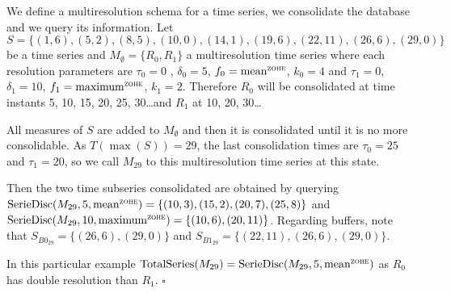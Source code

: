 \begin{example}\label{ex:model:smultiresolution} 
  We define a multiresolution schema for a time series, we consolidate
  the database and we query its information.  Let $S = \{
  (1,6),(5,2),\allowbreak (8,5),\allowbreak (10,0),\allowbreak
  (14,1),\allowbreak (19,6),\allowbreak (22,11),\allowbreak
  (26,6),(29,0) \}$ be a time series and $M_\emptyset=\{R_0,R_1\}$ a
  multiresolution time series where each resolution parameters are
  $\tau_0=0$ , $\delta_0=5$, $f_0 =\meanz$, $k_0=4$ and $\tau_1=0$,
  $\delta_1=10$, $f_1 =\maxz$, $k_1=2$. Therefore $R_0$ will be
  consolidated at time instants 5, 10, 15, 20, 25, 30\dots and $R_1$
  at 10, 20, 30\dots

  All measures of $S$ are added to $M_\emptyset$
  and then it is consolidated until it is no more consolidable. As
  $T(\max(S))=29$, the last consolidation times are $\tau_0=25$ and
  $\tau_1=20$, so we call $M_{29}$ to this multiresolution time series
  at this state.

  Then the two time subseries consolidated are obtained by querying
  $\seriedisc(M_{29},5,\allowbreak \meanz)=\{(10,3),\allowbreak
  (15,\allowbreak 2),\allowbreak (20,7),\allowbreak (25,8)\}$ and
  $\seriedisc(M_{29},10,\allowbreak  \maxz) =\allowbreak \{ \allowbreak
  (10,6),\allowbreak (20,11)\}$. Regarding buffers, note that
  $S_{B0_{29}}= \{\allowbreak (26,6),\allowbreak (29,0)\allowbreak \}$
  and $S_{B1_{29}}=\{\allowbreak (22,11),\allowbreak (26,6),(29,0)\}$.

  In this particular example
  $ \totalseries(M_{29}) = \seriedisc(M_{29},\allowbreak 5,\meanz)$ as $R_0$ has
  double resolution than $R_1$. $\square$
\end{example}







